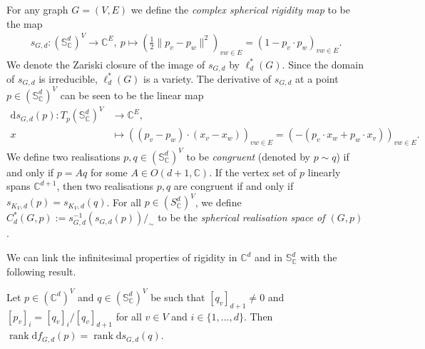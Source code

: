\documentclass[ALCO]{cedram}
\DeclareMathOperator{\rank}{rank}
\newcommand{\diff}{\mathrm{d}}
\begin{document}
For any graph $G=(V,E)$ we define the \emph{complex spherical rigidity map} to be the map
\begin{align*}
	s_{G,d} \colon (\mathbb{S}_{\mathbb{C}}^{d})^{V} \rightarrow \mathbb{C}^{E}, ~ p \mapsto \left( \frac{1}{2}\|p_v-p_w\|^2 \right)_{vw \in E} =\left( 1 - p_v \cdot p_w\right)_{vw \in E}.
\end{align*}
We denote the Zariski closure of the image of $s_{G,d}$ by $\ell^*_d(G)$.
Since the domain of $s_{G,d}$ is irreducible,
$\ell_d^*(G)$ is a variety.
The derivative of $s_{G,d}$ at a point $p \in (\mathbb{S}_{\mathbb{C}}^{d})^{V}$ can be seen to be the linear map
\begin{align*}
	\diff s_{G,d}(p) \colon T_p (\mathbb{S}_{\mathbb{C}}^{d})^{V} &\rightarrow \mathbb{C}^{E},\\
	x &\mapsto \left( (p_v-p_w) \cdot (x_v-x_w) \right)_{vw \in E} = \left(-(p_v \cdot x_w + p_w \cdot x_v) \right)_{vw \in E}.
\end{align*}
We define two realisations $p,q \in (\mathbb{S}_{\mathbb{C}}^{d})^V$ to be \emph{congruent} (denoted by $p \sim q$) if and only if $p = Aq$ for some $A \in O(d+1, \mathbb{C})$.
If the vertex set of $p$ linearly spans $\mathbb{C}^{d+1}$,
then two realisations $p,q$ are congruent if and only if $s_{K_V,d}(p) = s_{K_V,d}(q)$.
For all $p \in (S_\mathbb{C}^{d})^V$,
we define $C^*_d(G,p) := s^{-1}_{G,d} (s_{G,d}(p))/_\sim$ to be the \emph{spherical realisation space of $(G,p)$}.


We can link the infinitesimal properties of rigidity in $\mathbb{C}^d$ and in $\mathbb{S}^d_\mathbb{C}$ with the following result.

\begin{lemma}\label{l:equivrank}
	Let $p \in (\mathbb{C}^{d})^V$ and $q \in (\mathbb{S}_{\mathbb{C}}^{d})^V$ be such that $[q_{v}]_{d+1} \neq 0$ and $[p_v]_i = [q_v]_i/[q_v]_{d+1}$ for all $v \in V$ and $i \in \{1,\ldots,d\}$.
	Then $\rank \diff f_{G,d}(p)= \rank \diff s_{G,d}(q)$.
\end{lemma}
\end{document}
